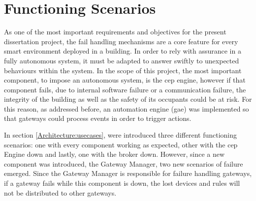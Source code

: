 \section{Functioning Scenarios}
\label{implementation:scenarios}

As one of the most important requirements and objectives for the present dissertation project, the fail handling mechanisms are a core feature for every smart environment deployed in a building. In order to rely with assurance in a fully autonomous system, it must be adapted to answer swiftly to unexpected behaviours within the system. In the scope of this project, the most important component, to impose an autonomous system, is the \ac{cep} engine, however if that component fails, due to internal software failure or a communication failure, the integrity of the building as well as the safety of its occupants could be at risk. For this reason, as addressed before, an automation engine (\ac{gae}) was implemented so that gateways could process events in order to trigger actions.

In section \ref{Architecture:usecases}, were introduced three different functioning scenarios: one with every component working as expected, other with the \ac{cep} Engine down and lastly, one with the broker down. However, since a new component was introduced, the Gateway Manager, two new scenarios of failure emerged. Since the Gateway Manager is responsible for failure handling gateways, if a gateway fails while this component is down, the lost devices and rules will not be distributed to other gateways.

